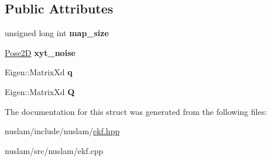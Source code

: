 \subsection*{Public Attributes}
\begin{DoxyCompactItemize}
\item 
\mbox{\label{structnuslam_1_1ProcessNoise_a6f3cca68cb5cbea26a72324dde7787f2}} 
unsigned long int {\bfseries map\+\_\+size}
\item 
\mbox{\label{structnuslam_1_1ProcessNoise_a1dc460a9ab6bb0e3f2c549c1cee87e42}} 
\hyperlink{structrigid2d_1_1Pose2D}{Pose2D} {\bfseries xyt\+\_\+noise}
\item 
\mbox{\label{structnuslam_1_1ProcessNoise_ab4c8c91544d776373fb415baf95cb9f8}} 
Eigen\+::\+Matrix\+Xd {\bfseries q}
\item 
\mbox{\label{structnuslam_1_1ProcessNoise_a01f5722b2393473f4bb3ccb2994a6dbe}} 
Eigen\+::\+Matrix\+Xd {\bfseries Q}
\end{DoxyCompactItemize}


The documentation for this struct was generated from the following files\+:\begin{DoxyCompactItemize}
\item 
nuslam/include/nuslam/\hyperlink{ekf_8hpp}{ekf.\+hpp}\item 
nuslam/src/nuslam/ekf.\+cpp\end{DoxyCompactItemize}
